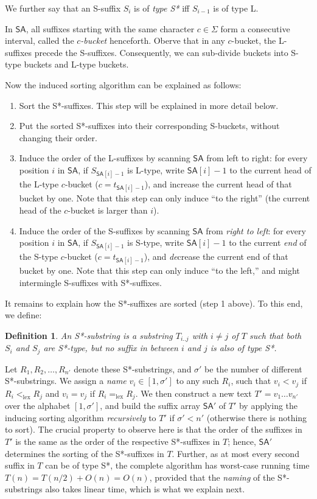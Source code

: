 \documentclass[11pt,onecolumn,final]{article} \usepackage[latin1]{inputenc}
\newcommand{\SA}[0]{\mathsf{SA}}
\newcommand{\SF}[1]{S_{#1}}
\theoremstyle{plain}
\newtheorem{definition}{Definition}
\theoremstyle{remark}
\begin{document}
We further say that an S-suffix $\SF{i}$ is of \emph{type S*} iff $\SF{i-1}$ is of type L.

In $\SA$, all suffixes starting with the same character $c\in\Sigma$ form a consecutive interval, called the \emph{$c$-bucket} henceforth. Oberve that in any $c$-bucket, the L-suffixes precede the S-suffixes. Consequently, we can sub-divide buckets into S-type buckets and L-type buckets.

Now the induced sorting algorithm can be explained as follows:

\begin{enumerate}
\item Sort the S*-suffixes. This step will be explained in more detail below.
\item Put the sorted S*-suffixes into their corresponding S-buckets, without changing their order.
\item Induce the order of the L-suffixes by scanning $\SA$ from left to right: for every position $i$ in $\SA$, if $\SF{\SA[i]-1}$ is L-type, write $\SA[i]-1$ to the current head of the L-type $c$-bucket ($c=t_{\SA[i]-1}$), and increase the current head of that bucket by one. Note that this step can only induce ``to the right'' (the current head of the $c$-bucket is larger than $i$).
\item Induce the order of the S-suffixes by scanning $\SA$ from \emph{right to left}: for every position $i$ in $\SA$, if $\SF{\SA[i]-1}$ is S-type, write $\SA[i]-1$ to the current \emph{end} of the S-type $c$-bucket ($c=t_{\SA[i]-1}$), and \emph{de}crease the current end of that bucket by one. Note that this step can only induce ``to the left,'' and might intermingle S-suffixes with S*-suffixes.
\end{enumerate}

It remains to explain how the S*-suffixes are sorted (step 1 above). To this end, we define:

\begin{definition}
  An \emph{S*-substring} is a substring $T_{i..j}$ with $i\ne j$ of $T$ such that both $\SF{i}$ and $\SF{j}$ are S*-type, but no suffix in between $i$ and $j$ is also of type S*.
\end{definition}

Let $R_1,R_2,\dots,R_{n'}$ denote these S*-substrings, and $\sigma'$ be the number of different S*-substrings. We assign a \emph{name} $v_i \in [1,\sigma']$ to any such $R_i$, such that $v_i < v_j$ if $R_i <_\mathrm{lex} R_j$ and $v_i = v_j$ if $R_i =_\mathrm{lex} R_j$. We then construct a new text $T'=v_1\dots v_{n'}$ over the alphabet $[1,\sigma']$, and build the suffix array $\SA'$ of $T'$ by applying the inducing sorting algorithm \emph{recursively} to $T'$ if $\sigma'<n'$ (otherwise there is nothing to sort). The crucial property \cite{nong09linear} to observe here is that the order of the suffixes in $T'$ is the same as the order of the respective S*-suffixes in $T$; hence, $\SA'$ determines the sorting of the S*-suffixes in $T$. Further, as at most every second suffix in $T$ can be of type S*, the complete algorithm has worst-case running time $T(n) = T(n/2)+O(n) = O(n)$, provided that the \emph{naming} of the S*-substrings also takes linear time, which is what we explain next.
\end{document}
